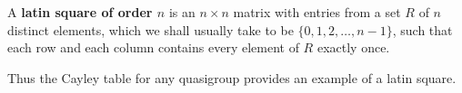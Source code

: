 A \textbf{latin square of order $n$} is an $n \times n$ matrix with entries from a set $R$ of $n$ distinct elements, which we shall usually take to be $\{0, 1, 2, \dots, n-1\}$, such that each row and each column contains every element of $R$ exactly once.

Thus the Cayley table for any quasigroup provides an example of a latin square.
